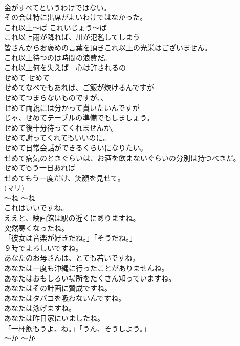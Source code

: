 \documentclass[8pt]{extreport}
\begin{document}
\begin{CJK}{UTF8}{min}
\\	金がすべてというわけではない。   
\\	その会は特に出席がよいわけではなかった。   
\\	これ以上〜ば	これいじょう〜ば	
\\	これ以上雨が降れば、川が氾濫してしまう  
\\	皆さんからお褒めの言葉を頂きこれ以上の光栄はございません。  
\\	これ以上待つのは時間の浪費だ。  
\\	これ以上何を失えば　心は許されるの  
\\	せめて	せめて	
\\	せめてなべでもあれば、ご飯が炊けるんですが  
\\	せめてつまらないものですが、、  
\\	せめて両親には分かって貰いたいんですが  
\\	じゃ、せめてテーブルの準備でもしましょう。  
\\	せめて後十分待ってくれませんか。  
\\	せめて謝ってくれてもいいのに。  
\\	せめて日常会話ができるくらいになりたい。  
\\	せめて病気のときぐらいは、お酒を飲まないぐらいの分別は持つべきだ。  
\\	せめてもう一日あれば  
\\	せめてもう一度だけ、笑顔を見せて。  
\\	(マリ)
\\	〜ね	〜ね	
\\	これはいいですね。
\\	ええと、映画館は駅の近くにありますね。
\\	突然寒くなったね。  
\\	「彼女は音楽が好きだね。」「そうだね。」  
\\	９時でよろしいですね。  
\\	あなたのお母さんは、とても若いですね。  
\\	あなたは一度も沖縄に行ったことがありませんね。  
\\	あなたはおもしろい場所をたくさん知っていますね。  
\\	あなたはその計画に賛成ですね。  
\\	あなたはタバコを吸わないんですね。  
\\	あなたは泳げますね。  
\\	あなたは昨日家にいましたね。  
\\	「一杯飲もうよ、ね。」「うん、そうしよう。」  
\\	〜か	〜か	

\end{CJK}
\end{document}
